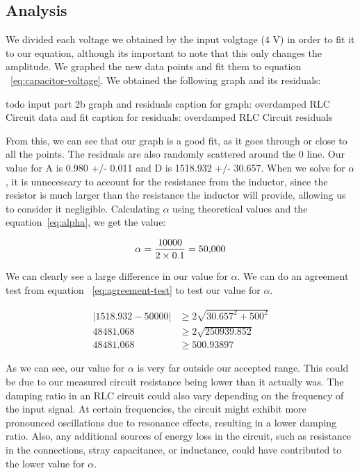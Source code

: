 \documentclass[11pt]{article}
\begin{document}
    \subsection{Analysis}\label{subsec:part2b_analysis}
    We divided each voltage we obtained by the input volgtage (4 V) in
    order to fit it to our equation, although its important to note that
    this only changes the amplitude. We graphed the new data points and fit
    them to equation ~\ref{eq:capacitor-voltage}. We obtained the following
    graph and its residuals:

    todo input part 2b graph and residuals
    caption for graph: overdamped RLC Circuit data and fit
    caption for residuals: overdamped RLC Circuit residuals

    From this, we can see that our graph is a good fit, as it goes through or close to all the points. The residuals are also randomly scattered around the 0 line. Our value for A is 0.980 +/- 0.011 and D is 1518.932 +/- 30.657. When we solve for \( \alpha \), it is unnecessary to account for the resistance from the inductor, since the resistor is much larger than the resistance the inductor will provide, allowing us to consider it negligible. Calculating \( \alpha \) using theoretical values and the equation~\ref{eq:alpha}, we get the value:

    \[
        \alpha = \frac{10000}{2 \times 0.1} \\ = 50{,}000
    \]

    We can clearly see a large difference in our value for \( \alpha \). We can do an agreement test from equation ~\ref{eq:agreement-test} to test our value for \( \alpha \).

    \begin{e}
        \begin{align*}
            |1518.932 - 50000| &\ge 2 \sqrt{30.657^2 + 500^2} \\
            48481.068 &\ge 2 \sqrt{250939.852} \\
            48481.068 &\ge 500.93897
        \end{align*}
    \end{e}

    As we can see, our value for \( \alpha \) is very far outside our accepted range. This could be due to our measured circuit resistance being lower than it actually was. The damping ratio in an RLC circuit could also vary depending on the frequency of the input signal. At certain frequencies, the circuit might exhibit more pronounced oscillations due to resonance effects, resulting in a lower damping ratio. Also, any additional sources of energy loss in the circuit, such as resistance in the connections, stray capacitance, or inductance, could have contributed to the lower value for \( \alpha \).
\end{document}
